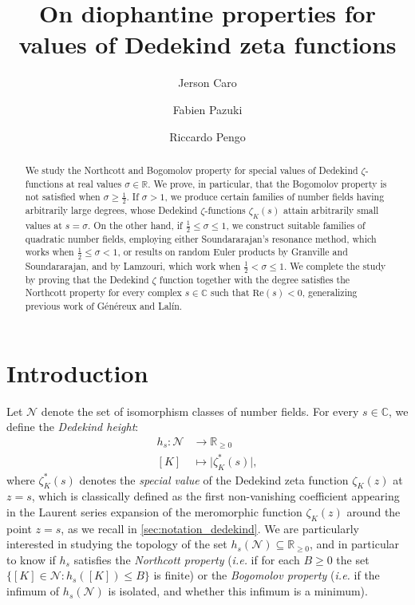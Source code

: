 \documentclass[10pt,a4paper]{amsart}
\title{On diophantine properties for values of Dedekind zeta functions}
\author{Jerson Caro}
\author{Fabien Pazuki}
\author{Riccardo Pengo}
\theoremstyle{plain}
\theoremstyle{definition}
\theoremstyle{remark}
\begin{document}
    \begin{abstract}
        We study the Northcott and Bogomolov property for special values of Dedekind $\zeta$-functions at real values $\sigma \in \mathbb{R}$. 
        We prove, in particular, that the Bogomolov property is not satisfied when $\sigma \geq \frac{1}{2}$. If $\sigma > 1$, we produce certain families of number fields having arbitrarily large degrees, whose Dedekind $\zeta$-functions $\zeta_K(s)$ attain arbitrarily small values at $s = \sigma$. 
        On the other hand, if $\frac{1}{2} \leq \sigma \leq 1$, we construct suitable families of quadratic number fields, employing either Soundararajan's resonance method, which works when $\frac{1}{2} \leq \sigma < 1$, or results on random Euler products by Granville and Soundararajan, and by Lamzouri, which work when $\frac{1}{2} < \sigma \leq 1$. 
        We complete the study by proving that the Dedekind $\zeta$ function together with the degree satisfies the Northcott property for every complex $s\in{\mathbb{C}}$ such that $\mathrm{Re}(s) <0$, generalizing previous work of Généreux and Lalín.
    \end{abstract}

\maketitle




    \section{Introduction}
    
    Let $\mathcal{N}$ denote the set of isomorphism classes of number fields. For every $s \in \mathbb{C}$, we define the \textit{Dedekind height}:
    \begin{equation} \label{eq:Dedekind_height}
        \begin{aligned}
            h_s \colon \mathcal{N} &\to \mathbb{R}_{\geq 0} \\
            [K] &\mapsto \lvert \zeta_K^\ast(s) \rvert,
        \end{aligned}
    \end{equation}
    where $\zeta^\ast_K(s)$ denotes the \textit{special value} of the Dedekind zeta function $\zeta_K(z)$ at $z = s$, which is classically defined as the first non-vanishing coefficient appearing in the Laurent series expansion of the meromorphic function $\zeta_K(z)$ around the point $z = s$, as we recall in \cref{sec:notation_dedekind}.
    We are particularly interested in studying the topology of the set $h_s(\mathcal{N}) \subseteq \mathbb{R}_{\geq 0}$, and in particular to know if $h_s$ satisfies the \textit{Northcott property} (\textit{i.e.} if for each $B \geq 0$ the set $\{ [K] \in \mathcal{N} \colon h_s([K]) \leq B \}$ is finite) or the \textit{Bogomolov property} (\textit{i.e.} if the infimum of $h_s(\mathcal{N})$ is isolated, and whether this infimum is a minimum). 
\end{document}
